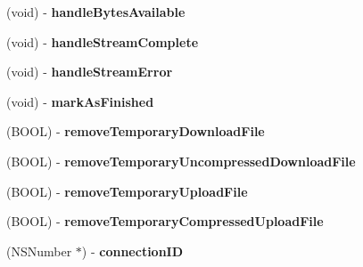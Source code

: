 \begin{DoxyCompactItemize}
\item 
\hypertarget{interface_a_s_i_h_t_t_p_request_aefae44a699dc9e70b78930322cfb3558}{
(void) -\/ {\bfseries handle\-Bytes\-Available}}
\label{interface_a_s_i_h_t_t_p_request_aefae44a699dc9e70b78930322cfb3558}

\item 
\hypertarget{interface_a_s_i_h_t_t_p_request_aaf27f7d11cd1194d5087db56cc553d89}{
(void) -\/ {\bfseries handle\-Stream\-Complete}}
\label{interface_a_s_i_h_t_t_p_request_aaf27f7d11cd1194d5087db56cc553d89}

\item 
\hypertarget{interface_a_s_i_h_t_t_p_request_ab792c755bbcec55490688d2b5aa729ec}{
(void) -\/ {\bfseries handle\-Stream\-Error}}
\label{interface_a_s_i_h_t_t_p_request_ab792c755bbcec55490688d2b5aa729ec}

\item 
\hypertarget{interface_a_s_i_h_t_t_p_request_a0b812d27bc2a7ad7715e6d890923426e}{
(void) -\/ {\bfseries mark\-As\-Finished}}
\label{interface_a_s_i_h_t_t_p_request_a0b812d27bc2a7ad7715e6d890923426e}

\item 
\hypertarget{interface_a_s_i_h_t_t_p_request_a0e68fd4f22a1b5cdcfb3e63a3cdacde9}{
(\-B\-O\-O\-L) -\/ {\bfseries remove\-Temporary\-Download\-File}}
\label{interface_a_s_i_h_t_t_p_request_a0e68fd4f22a1b5cdcfb3e63a3cdacde9}

\item 
\hypertarget{interface_a_s_i_h_t_t_p_request_af8ef43877926d01b8a51abb62dd2e208}{
(\-B\-O\-O\-L) -\/ {\bfseries remove\-Temporary\-Uncompressed\-Download\-File}}
\label{interface_a_s_i_h_t_t_p_request_af8ef43877926d01b8a51abb62dd2e208}

\item 
\hypertarget{interface_a_s_i_h_t_t_p_request_aaf8e3adbbf00110b67232158921553c0}{
(\-B\-O\-O\-L) -\/ {\bfseries remove\-Temporary\-Upload\-File}}
\label{interface_a_s_i_h_t_t_p_request_aaf8e3adbbf00110b67232158921553c0}

\item 
\hypertarget{interface_a_s_i_h_t_t_p_request_a4f8b19d66be57ffad0d6128182c98414}{
(\-B\-O\-O\-L) -\/ {\bfseries remove\-Temporary\-Compressed\-Upload\-File}}
\label{interface_a_s_i_h_t_t_p_request_a4f8b19d66be57ffad0d6128182c98414}

\item 
\hypertarget{interface_a_s_i_h_t_t_p_request_a3e06c0a51784d32cc8198f616e63c530}{
(\-N\-S\-Number $\ast$) -\/ {\bfseries connection\-I\-D}}
\label{interface_a_s_i_h_t_t_p_request_a3e06c0a51784d32cc8198f616e63c530}


\end{DoxyCompactItemize}
